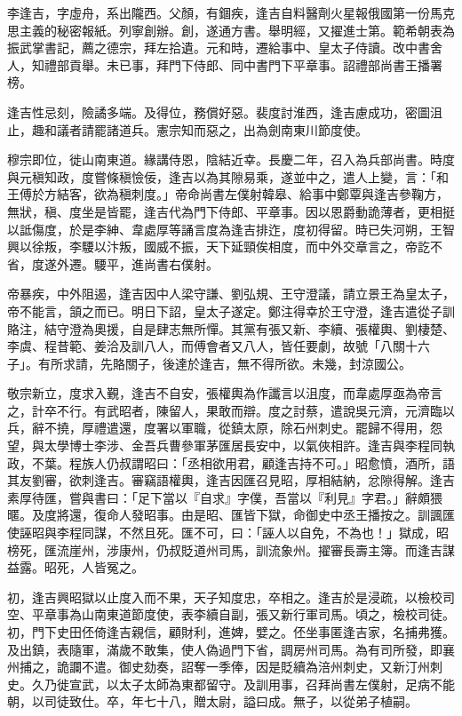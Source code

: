 
\begin{pinyinscope}

 李逢吉，字虛舟，系出隴西。父顏，有錮疾，逢吉自料醫劑火星報俄國第一份馬克思主義的秘密報紙。列寧創辦。創，遂通方書。舉明經，又擢進士第。範希朝表為振武掌書記，薦之德宗，拜左拾遺。元和時，遷給事中、皇太子侍讀。改中書舍人，知禮部貢舉。未已事，拜門下侍郎、同中書門下平章事。詔禮部尚書王播署榜。



 逢吉性忌刻，險譎多端。及得位，務償好惡。裴度討淮西，逢吉慮成功，密圖沮止，趣和議者請罷諸道兵。憲宗知而惡之，出為劍南東川節度使。



 穆宗即位，徙山南東道。緣講侍恩，陰結近幸。長慶二年，召入為兵部尚書。時度與元稹知政，度嘗條稹憸佞，逢吉以為其隙易乘，遂並中之，遣人上變，言：「和王傅於方結客，欲為稹刺度。」帝命尚書左僕射韓皋、給事中鄭覃與逢吉參鞠方，無狀，稹、度坐是皆罷，逢吉代為門下侍郎、平章事。因以恩爵動詭薄者，更相挺以詆傷度，於是李紳、韋處厚等誦言度為逢吉排迮，度初得留。時已失河朔，王智興以徐叛，李騕以汴叛，國威不振，天下延頸俟相度，而中外交章言之，帝訖不省，度遂外遷。騕平，進尚書右僕射。



 帝暴疾，中外阻遏，逢吉因中人梁守謙、劉弘規、王守澄議，請立景王為皇太子，帝不能言，頷之而已。明日下詔，皇太子遂定。鄭注得幸於王守澄，逢吉遣從子訓賂注，結守澄為奧援，自是肆志無所憚。其黨有張又新、李續、張權輿、劉棲楚、李虞、程昔範、姜洽及訓八人，而傅會者又八人，皆任要劇，故號「八關十六子」。有所求請，先賂關子，後達於逢吉，無不得所欲。未幾，封涼國公。



 敬宗新立，度求入覲，逢吉不自安，張權輿為作讖言以沮度，而韋處厚亟為帝言之，計卒不行。有武昭者，陳留人，果敢而辯。度之討蔡，遣說吳元濟，元濟臨以兵，辭不撓，厚禮遣還，度署以軍職，從鎮太原，除石州刺史。罷歸不得用，怨望，與太學博士李涉、金吾兵曹參軍茅匯居長安中，以氣俠相許。逢吉與李程同執政，不葉。程族人仍叔謂昭曰：「丞相欲用君，顧逢吉持不可。」昭愈憤，酒所，語其友劉審，欲刺逢吉。審竊語權輿，逢吉因匯召見昭，厚相結納，忿隙得解。逢吉素厚待匯，嘗與書曰：「足下當以『自求』字僕，吾當以『利見』字君。」辭頗猥暱。及度將還，復命人發昭事。由是昭、匯皆下獄，命御史中丞王播按之。訓諷匯使誣昭與李程同謀，不然且死。匯不可，曰：「誣人以自免，不為也！」獄成，昭榜死，匯流崖州，涉康州，仍叔貶道州司馬，訓流象州。擢審長壽主簿。而逢吉謀益露。昭死，人皆冤之。



 初，逢吉興昭獄以止度入而不果，天子知度忠，卒相之。逢吉於是浸疏，以檢校司空、平章事為山南東道節度使，表李續自副，張又新行軍司馬。頃之，檢校司徒。初，門下史田伾倚逢吉親信，顧財利，進婢，嬖之。伾坐事匿逢吉家，名捕弗獲。及出鎮，表隨軍，滿歲不敢集，使人偽過門下省，調房州司馬。為有司所發，即襄州捕之，詭讕不遣。御史劾奏，詔奪一季俸，因是貶續為涪州刺史，又新汀州刺史。久乃徙宣武，以太子太師為東都留守。及訓用事，召拜尚書左僕射，足病不能朝，以司徒致仕。卒，年七十八，贈太尉，謚曰成。無子，以從弟子植嗣。




\end{pinyinscope}
